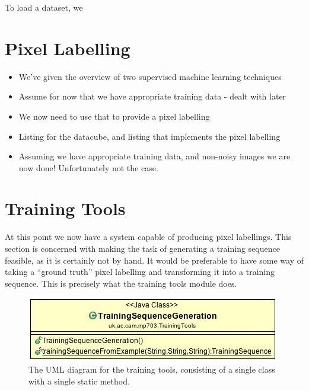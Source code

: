 \documentclass[12pt,twoside,notitlepage]{report}
\begin{document}
        To load a dataset, we 







    \section{Pixel Labelling}
        \begin{itemize}
            \item We've given the overview of two supervised machine learning techniques
            \item Assume for now that we have appropriate training data - dealt with later
            \item We now need to use that to provide a pixel labelling
            \item Listing for the datacube, and listing that implements the pixel labelling
            \item Assuming we have appropriate training data, and non-noisy images we are now done! Unfortunately not the case.
        \end{itemize}





    \section{Training Tools} \label{sec:training_tools}
        At this point we now have a system capable of producing pixel labellings. This section is concerned with 
        making the task of generating a training sequence feasible, as it is certainly not by hand. It would be 
        preferable to have some way of taking a ``ground truth'' pixel labelling and transforming it into a training 
        sequence. This is precisely what the training tools module does. 

        \begin{figure}[H]
            \centering
            \includegraphics[scale=0.5]{TrainingTools_UML}
            \caption{The UML diagram for the training tools, consisting of a single class with a single static method.}
        \end{figure}
\end{document}
